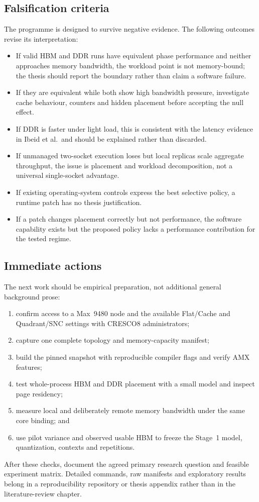 \subsection{Falsification criteria}

The programme is designed to survive negative evidence.  The following
outcomes revise its interpretation:

\begin{itemize}
  \item If valid HBM and DDR runs have equivalent phase performance and
        neither approaches memory bandwidth, the workload point is not
        memory-bound; the thesis should report the boundary rather than
        claim a software failure.
  \item If they are equivalent while both show high bandwidth pressure,
        investigate cache behaviour, counters and hidden placement
        before accepting the null effect.
  \item If DDR is faster under light load, this is consistent with the
        latency evidence in Ibeid et al.\ and should be explained rather
        than discarded.
  \item If unmanaged two-socket execution loses but local replicas
        scale aggregate throughput, the issue is placement and workload
        decomposition, not a universal single-socket advantage.
  \item If existing operating-system controls express the best selective
        policy, a runtime patch has no thesis justification.
  \item If a patch changes placement correctly but not performance, the
        software capability exists but the proposed policy lacks a
        performance contribution for the tested regime.
\end{itemize}

\subsection{Immediate actions}

The next work should be empirical preparation, not additional general
background prose:

\begin{enumerate}
  \item confirm access to a Max~9480 node and the available Flat/Cache
        and Quadrant/SNC settings with CRESCO8 administrators;
  \item capture one complete topology and memory-capacity manifest;
  \item build the pinned \lcpp{} snapshot with reproducible compiler
        flags and verify AMX features;
  \item test whole-process HBM and DDR placement with a small model and
        inspect page residency;
  \item measure local and deliberately remote memory bandwidth under
        the same core binding; and
  \item use pilot variance and observed usable HBM to freeze the Stage~1
        model, quantization, contexts and repetitions.
\end{enumerate}

After these checks, document the agreed primary research question and
feasible experiment matrix. Detailed commands, raw manifests and exploratory
results belong in a reproducibility repository or thesis appendix rather than
in the literature-review chapter.
